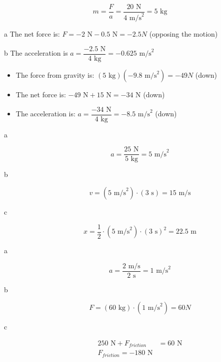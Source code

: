 \documentclass{exam}
\begin{document}
\begin{description}
\[
  m = \frac{F}{a} = \frac{20 \text{ N}}{4 \text{ m/s}^2} = 5 \text{ kg}
\]

\item[E9]
\begin{description*}
\item[a] The net force is: $F = -2 \text{ N} - 0.5 \text{ N}= -2.5N$ (opposing the motion)
\item[b] The acceleration is $a = \dfrac{-2.5 \text{ N}}{4 \text{ kg}} = -0.625 \text{ m/s}^2$
\end{description*}

\item[E15]
\begin{itemize}
  \item The force from gravity is: $(5 \text{ kg}) (-9.8 \text{ m/s}^2) = -49 N$ (down)
  \item The net force is: $-49 \text{ N}+ 15 \text{ N}= -34 \text{ N}$ (down)
  \item The acceleration is: $a = \dfrac{-34 \text{ N}}{4 \text{ kg}} = -8.5 \text{ m/s}^2$ (down)
\end{itemize}

\item[SP1]

\begin{description}
\item[a]
\[
  a = \frac{25 \text{ N}}{5 \text{ kg}} = 5 \text{ m/s}^2
\]

\item[b]
\[
  v = (5 \text{ m/s}^2) \cdot (3 \text{ s}) = 15 \text{ m/s}
\]

\item[c]
\[
  x = \frac{1}{2} \cdot (5 \text{ m/s}^2) \cdot (3 \text{ s})^2 = 22.5 \text{ m}
\]

\end{description}

\item[SP2]

\begin{description}
\item[a]
\[
  a = \frac{2 \text{ m/s}}{2 \text{ s}} = 1 \text{ m/s}^2
\]

\item[b]
\[
  F = (60 \text{ kg}) \cdot (1 \text{ m/s}^2) = 60 N
\]

\item[c]
\begin{align*}
  250 \text{ N} + F_{friction} &= 60 \text{ N} \\
  F_{friction} = -180 \text{ N} \\  
\end{align*}


\end{description}
\end{description}
\end{document}
